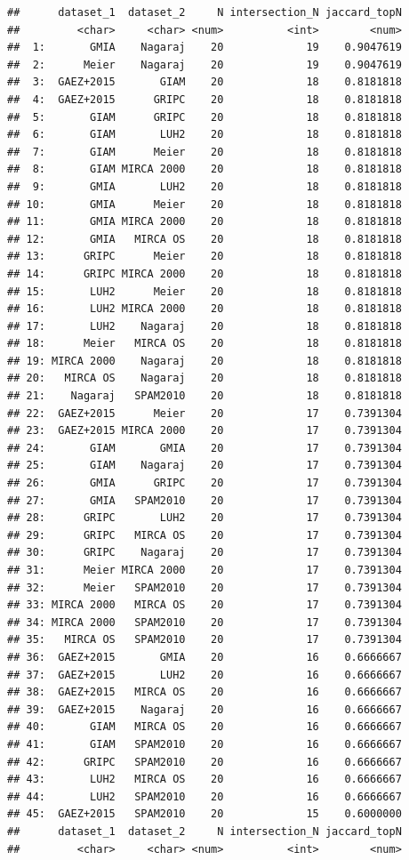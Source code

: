\documentclass[
  11pt,
]{article}
\begin{document}
\begin{verbatim}
##      dataset_1  dataset_2     N intersection_N jaccard_topN
##         <char>     <char> <num>          <int>        <num>
##  1:       GMIA    Nagaraj    20             19    0.9047619
##  2:      Meier    Nagaraj    20             19    0.9047619
##  3:  GAEZ+2015       GIAM    20             18    0.8181818
##  4:  GAEZ+2015      GRIPC    20             18    0.8181818
##  5:       GIAM      GRIPC    20             18    0.8181818
##  6:       GIAM       LUH2    20             18    0.8181818
##  7:       GIAM      Meier    20             18    0.8181818
##  8:       GIAM MIRCA 2000    20             18    0.8181818
##  9:       GMIA       LUH2    20             18    0.8181818
## 10:       GMIA      Meier    20             18    0.8181818
## 11:       GMIA MIRCA 2000    20             18    0.8181818
## 12:       GMIA   MIRCA OS    20             18    0.8181818
## 13:      GRIPC      Meier    20             18    0.8181818
## 14:      GRIPC MIRCA 2000    20             18    0.8181818
## 15:       LUH2      Meier    20             18    0.8181818
## 16:       LUH2 MIRCA 2000    20             18    0.8181818
## 17:       LUH2    Nagaraj    20             18    0.8181818
## 18:      Meier   MIRCA OS    20             18    0.8181818
## 19: MIRCA 2000    Nagaraj    20             18    0.8181818
## 20:   MIRCA OS    Nagaraj    20             18    0.8181818
## 21:    Nagaraj   SPAM2010    20             18    0.8181818
## 22:  GAEZ+2015      Meier    20             17    0.7391304
## 23:  GAEZ+2015 MIRCA 2000    20             17    0.7391304
## 24:       GIAM       GMIA    20             17    0.7391304
## 25:       GIAM    Nagaraj    20             17    0.7391304
## 26:       GMIA      GRIPC    20             17    0.7391304
## 27:       GMIA   SPAM2010    20             17    0.7391304
## 28:      GRIPC       LUH2    20             17    0.7391304
## 29:      GRIPC   MIRCA OS    20             17    0.7391304
## 30:      GRIPC    Nagaraj    20             17    0.7391304
## 31:      Meier MIRCA 2000    20             17    0.7391304
## 32:      Meier   SPAM2010    20             17    0.7391304
## 33: MIRCA 2000   MIRCA OS    20             17    0.7391304
## 34: MIRCA 2000   SPAM2010    20             17    0.7391304
## 35:   MIRCA OS   SPAM2010    20             17    0.7391304
## 36:  GAEZ+2015       GMIA    20             16    0.6666667
## 37:  GAEZ+2015       LUH2    20             16    0.6666667
## 38:  GAEZ+2015   MIRCA OS    20             16    0.6666667
## 39:  GAEZ+2015    Nagaraj    20             16    0.6666667
## 40:       GIAM   MIRCA OS    20             16    0.6666667
## 41:       GIAM   SPAM2010    20             16    0.6666667
## 42:      GRIPC   SPAM2010    20             16    0.6666667
## 43:       LUH2   MIRCA OS    20             16    0.6666667
## 44:       LUH2   SPAM2010    20             16    0.6666667
## 45:  GAEZ+2015   SPAM2010    20             15    0.6000000
##      dataset_1  dataset_2     N intersection_N jaccard_topN
##         <char>     <char> <num>          <int>        <num>
\end{verbatim}
\end{document}
